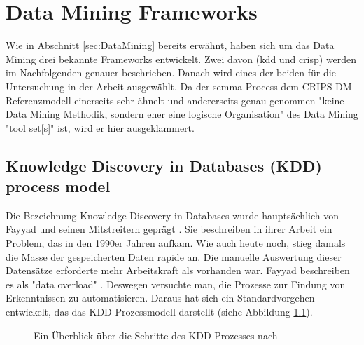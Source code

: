 \chapter{Data Mining Frameworks}\label{sec:DataMiningFrameworks}
Wie in Abschnitt \ref{sec:DataMining} bereits erwähnt, haben sich um das Data Mining drei bekannte Frameworks entwickelt. Zwei davon (\gls{kdd} und \gls{crisp}) werden im Nachfolgenden genauer beschrieben. Danach wird eines der beiden für die Untersuchung in der Arbeit ausgewählt. Da der \gls{semma}-Process dem CRIPS-DM Referenzmodell einerseits sehr ähnelt und andererseits genau genommen "keine Data Mining Methodik, sondern eher eine logische Organisation" des Data Mining "tool set[s]" \citep[eigene Übersetzung]{enterpriseminer_sas_2012} ist, wird er hier ausgeklammert. 

\section{Knowledge Discovery in Databases (KDD) process model}\label{sec:kdd}
Die Bezeichnung Knowledge Discovery in Databases wurde hauptsächlich von Fayyad und seinen Mitstreitern geprägt \citep{fayyad_data_1996}. Sie beschreiben in ihrer Arbeit ein Problem, das in den 1990er Jahren aufkam. Wie auch heute noch, stieg damals die Masse der gespeicherten Daten rapide an. Die manuelle Auswertung dieser Datensätze erforderte mehr Arbeitskraft als vorhanden war. Fayyad beschreiben es als "data overload" \citep[S.~38]{fayyad_data_1996}. Deswegen versuchte man, die Prozesse zur Findung von Erkenntnissen zu automatisieren. Daraus hat sich ein Standardvorgehen entwickelt, das das KDD-Prozessmodell darstellt (siehe Abbildung \ref{fig:kddprocess}).
\begin{figure}[H]
\centering
{}
\caption{Ein Überblick über die Schritte des KDD Prozesses nach \citep[S.~41]{fayyad_data_1996}}
\label{fig:kddprocess}
\end{figure}


